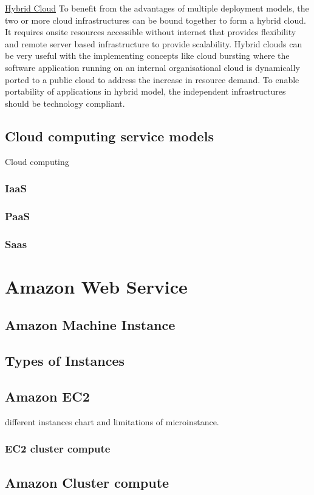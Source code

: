 \documentclass[12pt,a4paper]{report}
\begin{document}
\underline{Hybrid Cloud}  
To benefit from the advantages of multiple deployment models, the two or more cloud infrastructures can be bound together to form a hybrid cloud. It requires onsite resources accessible without internet that provides flexibility and remote server based infrastructure to provide scalability. Hybrid clouds can be very useful with the implementing concepts like cloud bursting where the software application running on an internal organisational cloud is dynamically ported to a public cloud to address the increase in resource demand. To enable portability of applications in hybrid model, the independent infrastructures should be technology compliant.  


\subsection{Cloud computing service models}  
Cloud computing   
\subsubsection{IaaS}  
\subsubsection{PaaS}  
\subsubsection{Saas}  


\section{Amazon Web Service}  
\subsection{Amazon Machine Instance}  
\subsection{Types of Instances}  
\subsection{Amazon EC2}  
different instances chart and limitations of microinstance.  
\subsubsection{EC2 cluster compute}  
\subsection{Amazon Cluster compute}  
\end{document}
